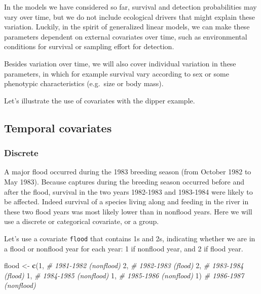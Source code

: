 \documentclass[
  12pt,
]{krantz}
\newenvironment{Shaded}{\begin{snugshade}}{\end{snugshade}}
\newcommand{\CommentTok}[1]{\textcolor[rgb]{0.56,0.35,0.01}{\textit{#1}}}
\newcommand{\DecValTok}[1]{\textcolor[rgb]{0.00,0.00,0.81}{#1}}
\newcommand{\FunctionTok}[1]{\textcolor[rgb]{0.13,0.29,0.53}{\textbf{#1}}}
\newcommand{\NormalTok}[1]{#1}
\newcommand{\OtherTok}[1]{\textcolor[rgb]{0.56,0.35,0.01}{#1}}
\begin{document}
In the models we have considered so far, survival and detection probabilities may vary over time, but we do not include ecological drivers that might explain these variation. Luckily, in the spirit of generalized linear models, we can make these parameters dependent on external covariates over time, such as environmental conditions for survival or sampling effort for detection.

Besides variation over time, we will also cover individual variation in these parameters, in which for example survival vary according to sex or some phenotypic characteristics (e.g.~size or body mass).

Let's illustrate the use of covariates with the dipper example.

\subsection{Temporal covariates}\label{temporal-covariates}

\subsubsection{Discrete}\label{discrete}

A major flood occurred during the 1983 breeding season (from October 1982 to May 1983). Because captures during the breeding season occurred before and after the flood, survival in the two years 1982-1983 and 1983-1984 were likely to be affected. Indeed survival of a species living along and feeding in the river in these two flood years was most likely lower than in nonflood years. Here we will use a discrete or categorical covariate, or a group.

Let's use a covariate \texttt{flood} that contains 1s and 2s, indicating whether we are in a flood or nonflood year for each year: 1 if nonflood year, and 2 if flood year.

\begin{Shaded}
\begin{Highlighting}[]
\NormalTok{flood }\OtherTok{\textless{}{-}} \FunctionTok{c}\NormalTok{(}\DecValTok{1}\NormalTok{, }\CommentTok{\# 1981{-}1982 (nonflood)}
           \DecValTok{2}\NormalTok{, }\CommentTok{\# 1982{-}1983 (flood)}
           \DecValTok{2}\NormalTok{, }\CommentTok{\# 1983{-}1984 (flood)}
           \DecValTok{1}\NormalTok{, }\CommentTok{\# 1984{-}1985 (nonflood)}
           \DecValTok{1}\NormalTok{, }\CommentTok{\# 1985{-}1986 (nonflood)}
           \DecValTok{1}\NormalTok{) }\CommentTok{\# 1986{-}1987 (nonflood)}
\end{Highlighting}
\end{Shaded}
\end{document}
